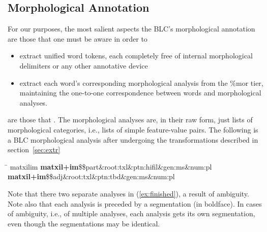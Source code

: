 \subsection{Morphological Annotation}
For our purposes, the most salient aspects the \ac{BLC}'s morphological 
annotation are those that one must be aware in order to 
\begin{itemize}
\item extract unified word tokens, each completely free of internal morphological 
delimiters or any other annotative device
\item extract each word's corresponding morphological analysis from the 
\textsf{\%mor} tier, maintaining the one-to-one
correspondence between words and morphological analyses. 
\end{itemize}  are those that \citep{albert-et-al:2012}.
The morphological analyses are, in their raw form, just lists of morphological categories, 
i.e., lists of simple feature-value pairs.
The following is a \ac{BLC} morphological analysis after undergoing the transformations 
described in section~\ref{sec:extr}
\begin{exe} 
\ex \label{ex:finished}
\begin{tabbing}
\hspace{0.8in} \= \hspace{5.5in} \kill
\textsf{matxilim} \> \textsf{\textbf{matxil+im}\$\$part\&root:txl\&ptn:hifil\&gen:ms\&num:pl}\, \\
\> \textsf{\textbf{matxil+im}\$\$adj\&root:txl\&ptn:tbd\&gen:ms\&num:pl}
\end{tabbing}
\end{exe}
Note that there two separate analyses in (\ref{ex:finished}), a result of ambiguity. 
Note also that each analysis is preceded by a segmentation (in boldface). 
In cases of ambiguity, i.e., of multiple analyses, each analysis gets its own 
segmentation, even though the segmentations may be identical.

